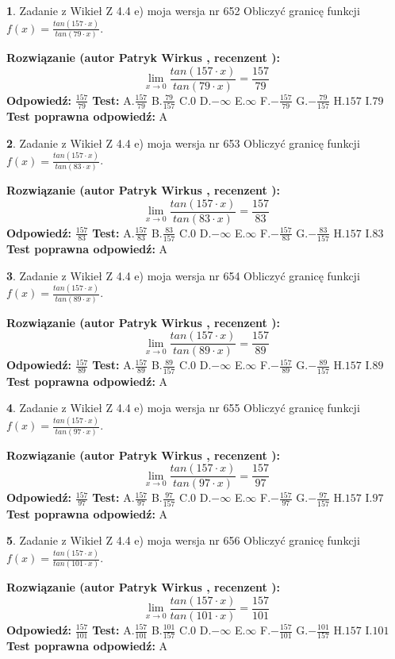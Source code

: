 \documentclass[12pt, a4paper]{article}
\theoremstyle{definition} %
\newtheorem{zad}{}
\newcommand{\zadStart}[1]{\begin{zad}#1\newline}
\newcommand{\zadStop}{\end{zad}}
\newcommand{\rozwStart}[2]{\noindent \textbf{Rozwiązanie (autor #1 , recenzent #2): }\newline}
\newcommand{\rozwStop}{\newline}
\newcommand{\odpStart}{\noindent \textbf{Odpowiedź:}\newline}
\newcommand{\odpStop}{\newline}
\newcommand{\testStart}{\noindent \textbf{Test:}\newline}
\newcommand{\testStop}{\newline}
\newcommand{\kluczStart}{\noindent \textbf{Test poprawna odpowiedź:}\newline}
\newcommand{\kluczStop}{\newline}
\begin{document}
\zadStart{Zadanie z Wikieł Z 4.4 e) moja wersja nr 652}
Obliczyć granicę funkcji $f(x)=\frac{tan(157\cdot x)}{tan(79\cdot x)}$.
\zadStop
\rozwStart{Patryk Wirkus}{}
$$\lim\limits_{x\to 0}\frac{tan(157\cdot x)}{tan(79\cdot x)}=
\frac{157}{79}$$
\rozwStop
\odpStart
$\frac{157}{79}$
\odpStop
\testStart
A.$\frac{157}{79}$
B.$\frac{79}{157}$
C.$0$
D.$-\infty$
E.$\infty$
F.$-\frac{157}{79}$
G.$-\frac{79}{157}$
H.$157$
I.$79$
\testStop
\kluczStart
A
\kluczStop



\zadStart{Zadanie z Wikieł Z 4.4 e) moja wersja nr 653}
Obliczyć granicę funkcji $f(x)=\frac{tan(157\cdot x)}{tan(83\cdot x)}$.
\zadStop
\rozwStart{Patryk Wirkus}{}
$$\lim\limits_{x\to 0}\frac{tan(157\cdot x)}{tan(83\cdot x)}=
\frac{157}{83}$$
\rozwStop
\odpStart
$\frac{157}{83}$
\odpStop
\testStart
A.$\frac{157}{83}$
B.$\frac{83}{157}$
C.$0$
D.$-\infty$
E.$\infty$
F.$-\frac{157}{83}$
G.$-\frac{83}{157}$
H.$157$
I.$83$
\testStop
\kluczStart
A
\kluczStop



\zadStart{Zadanie z Wikieł Z 4.4 e) moja wersja nr 654}
Obliczyć granicę funkcji $f(x)=\frac{tan(157\cdot x)}{tan(89\cdot x)}$.
\zadStop
\rozwStart{Patryk Wirkus}{}
$$\lim\limits_{x\to 0}\frac{tan(157\cdot x)}{tan(89\cdot x)}=
\frac{157}{89}$$
\rozwStop
\odpStart
$\frac{157}{89}$
\odpStop
\testStart
A.$\frac{157}{89}$
B.$\frac{89}{157}$
C.$0$
D.$-\infty$
E.$\infty$
F.$-\frac{157}{89}$
G.$-\frac{89}{157}$
H.$157$
I.$89$
\testStop
\kluczStart
A
\kluczStop



\zadStart{Zadanie z Wikieł Z 4.4 e) moja wersja nr 655}
Obliczyć granicę funkcji $f(x)=\frac{tan(157\cdot x)}{tan(97\cdot x)}$.
\zadStop
\rozwStart{Patryk Wirkus}{}
$$\lim\limits_{x\to 0}\frac{tan(157\cdot x)}{tan(97\cdot x)}=
\frac{157}{97}$$
\rozwStop
\odpStart
$\frac{157}{97}$
\odpStop
\testStart
A.$\frac{157}{97}$
B.$\frac{97}{157}$
C.$0$
D.$-\infty$
E.$\infty$
F.$-\frac{157}{97}$
G.$-\frac{97}{157}$
H.$157$
I.$97$
\testStop
\kluczStart
A
\kluczStop



\zadStart{Zadanie z Wikieł Z 4.4 e) moja wersja nr 656}
Obliczyć granicę funkcji $f(x)=\frac{tan(157\cdot x)}{tan(101\cdot x)}$.
\zadStop
\rozwStart{Patryk Wirkus}{}
$$\lim\limits_{x\to 0}\frac{tan(157\cdot x)}{tan(101\cdot x)}=
\frac{157}{101}$$
\rozwStop
\odpStart
$\frac{157}{101}$
\odpStop
\testStart
A.$\frac{157}{101}$
B.$\frac{101}{157}$
C.$0$
D.$-\infty$
E.$\infty$
F.$-\frac{157}{101}$
G.$-\frac{101}{157}$
H.$157$
I.$101$
\testStop
\kluczStart
A
\kluczStop
\end{document}
